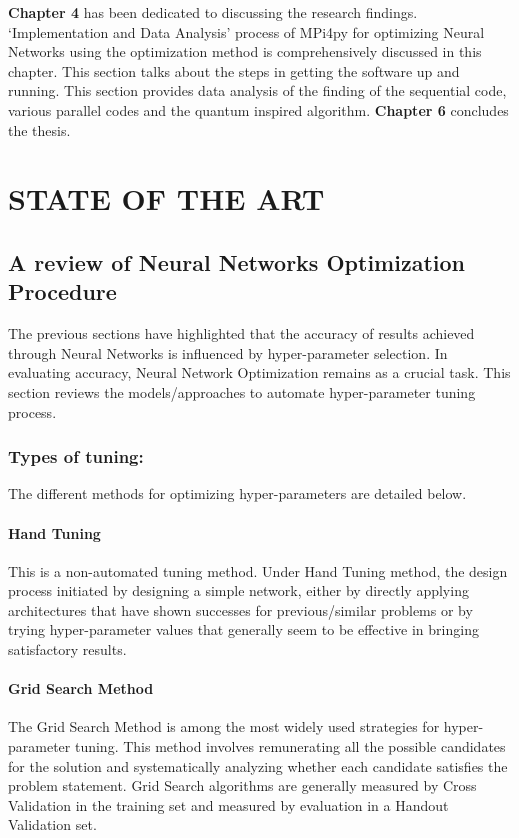 \textbf{Chapter 4 }has been dedicated to discussing the research findings. ‘Implementation and Data Analysis’ process of MPi4py for optimizing Neural Networks using the optimization method is comprehensively discussed in this chapter. This section talks about the steps in getting the software up and running. This section provides data analysis of the finding of the sequential code, various parallel codes and the quantum inspired algorithm. \textbf{Chapter 6 } concludes the thesis.




\chapter{STATE OF THE ART}


\section{A review of Neural Networks Optimization Procedure}
The previous sections have highlighted that the accuracy of results achieved through Neural Networks is influenced by hyper-parameter selection. In evaluating accuracy, Neural Network Optimization remains as a crucial task. This section reviews the models/approaches to automate hyper-parameter tuning process.

\subsection{Types of tuning: }
The different methods for optimizing hyper-parameters are detailed below.

\subsubsection{Hand Tuning}
This is a non-automated tuning method. Under Hand Tuning method, the design process initiated by designing a simple network, either by directly applying architectures that have shown successes for previous/similar problems or by trying hyper-parameter values that generally seem to be effective in bringing satisfactory results.

\subsubsection{Grid Search Method}

The Grid Search Method is among the most widely used strategies for hyper-parameter tuning\cite{bergstra2012random}. This method involves remunerating all the possible candidates for the solution and systematically analyzing whether each candidate satisfies the problem statement. Grid Search algorithms are generally measured by Cross Validation in the training set\cite{hsu2003practical}  and measured by evaluation in a Handout Validation set\cite{chicco2017ten}.


